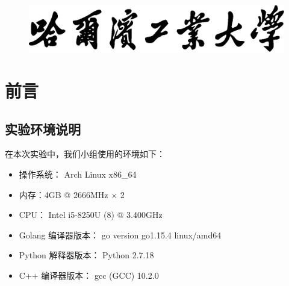 \documentclass[12pt,onecolumn]{report}
\newcommand{\hei}{\CJKfamily{hei}}      %
\newcommand{\kai}{\CJKfamily{kai}}      %
\theoremstyle{plain}
\numberwithin{figure}{section}
\begin{document}
\begin{titlepage}
  \centering

  \kai\xiaochu{}

  \vspace{5\baselineskip}

  \hei\xiaosan{}
  ~\underline{} \\
  ~\underline{} \\
  ~\underline{} \\
  ~\underline{} \\
  ~\underline{} \\
  ~\underline{} \\
  ~\underline{} \\

  \vspace{3\baselineskip}
  \begin{figure}[ht]
    \centering
    \includegraphics[width=0.6\linewidth,centering]{figures/school.eps}
  \end{figure}
\end{titlepage}


\clearpage
\tableofcontents
\clearpage

\setcounter{chapter}{-1}
\chapter{前言}
\section{实验环境说明}
在本次实验中，我们小组使用的环境如下：
\begin{itemize}[fullwidth,itemindent=\parindent]
\item 操作系统： Arch Linux x86\_64
\item 内存：4GB @ 2666MHz $\times$ 2
\item CPU： Intel i5-8250U (8) @ 3.400GHz
\item Golang 编译器版本： go version go1.15.4 linux/amd64
\item Python 解释器版本： Python 2.7.18
\item C++ 编译器版本： gcc (GCC) 10.2.0
\end{itemize}
\end{document}
